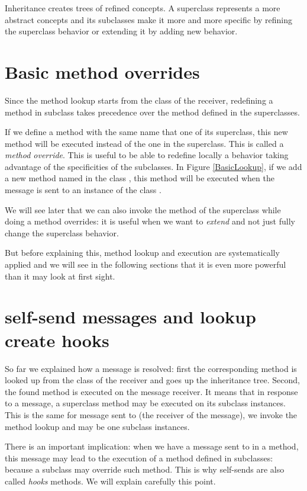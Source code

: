 \documentclass[10pt,twoside,english]{_support/latex/sbabook/sbabook}
\begin{document}
Inheritance creates trees of refined concepts. A superclass represents a more abstract concepts and its subclasses make it more and more specific by refining the superclass behavior or extending it by adding new behavior. 
\section{Basic method overrides}
Since the method lookup starts from the class of the receiver, redefining a method in subclass takes precedence over the method defined in the superclasses.

If we define a method with the same name that one of its superclass, this new method will be executed instead of the one in the superclass. This is called a \textit{method override}. This is useful to be able to redefine locally a behavior taking advantage of the specificities of the subclasses. In Figure \ref{BasicLookup}, if we add a new method named  in the class , this method will be executed when the message  is sent to an instance of the class . 

We will see later that we can also invoke the method of the superclass while doing a method overrides: it is useful when we want to \textit{extend} and not just fully change the superclass behavior. 

But before explaining this, method lookup and execution are systematically applied and we will see in the following sections that it is even more powerful than it may look at first sight.
\section{self-send messages and lookup create hooks}
So far we explained how a message is resolved: first the corresponding method is looked up from the class of the receiver and goes up the inheritance tree. Second, the found method is executed on the message receiver. It means that in response to a message, a superclass method may be executed on its subclass instances. This is the same for message sent to  (the receiver of the message), we invoke the method lookup and  may be one subclass instances.

There is an important implication: when we have a message sent to  in a method, this message may lead to the execution of a method defined in subclasses: because a subclass may override such method. This is why self-sends are also called \textit{hooks} methods. We will explain carefully this point. 
\end{document}
